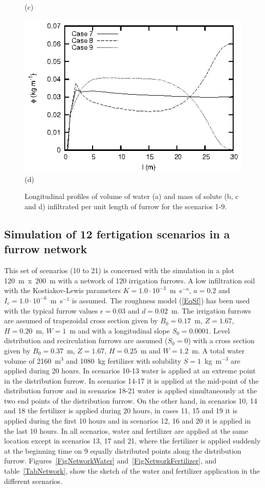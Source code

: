 \documentclass[review,authoryear]{elsarticle}
\begin{document}
\begin{figure}[ht!]
\begin{minipage}{0.49\textwidth}
(c)
\end{minipage}
\begin{minipage}{0.49\textwidth}
\centering
\includegraphics{fertilizer789.eps}
(d)
\end{minipage}
\caption{Longitudinal profiles of volume of water (a) and mass of solute
(b, c and d) infiltrated per unit length of furrow for the scenarios 1-9.}
\label{FigCases}
\end{figure}

\subsection{Simulation of 12 fertigation scenarios in a furrow network}

This set of scenarios (10 to 21) is concerned with the simulation in a plot
120~m~x~200~m with a network of 120 irrigation furrows. A low infiltration soil
with the Kostiakov-Lewis parameters $K=1.0\cdot10^{-3}$~m~s$^{-a}$,
$a=0.2$ and $I_c=1.0\cdot10^{-6}$~m~s$^{-1}$ is assumed. The roughness model (\ref{EqSf})
has been used with the typical  furrow values $\epsilon=0.03$ and $d=0.02$~m.
The irrigation furrows are assumed of trapezoidal cross section given by 
$B_0=0.17$~m, $Z=1.67$, $H=0.20$~m, $W=1$~m and with a longitudinal slope $S_0=0.0001$.
Level distribution and recirculation furrows are assumed ($S_0=0$) with a
cross section given by $B_0=0.37$~m, $Z=1.67$, $H=0.25$~m and $W=1.2$~m. A total
water volume of 2160~m$^3$ and 1080~kg fertilizer with solubility
$S=1$~kg~m$^{-3}$ are applied during 20 hours. In scenarios 10-13 water is applied at
an extreme point in the distribution furrow. In scenarios 14-17 it is applied at
the mid-point of the distribution furrow and in scenarios 18-21 water is applied
simultaneously at the two end points of the distribution furrow. On the other
hand, in scenarios 10, 14 and 18 the fertilizer is applied during 20 hours, in cases
11, 15 and 19 it is applied during the first 10 hours and in scenarios 12, 16 and
20 it is applied in the last 10 hours. In all scenarios, water and fertilizer
are applied at the same location except in scenarios 13, 17 and 21, where the
fertilizer is applied suddenly at the beginning time on 9 equally distributed
points along the distribution furrow. Figures~\ref{FigNetworkWater}
and~\ref{FigNetworkFertilizer}, and table~\ref{TabNetwork}, show the sketch of
the water and fertilizer application in the different scenarios.
\end{document}
